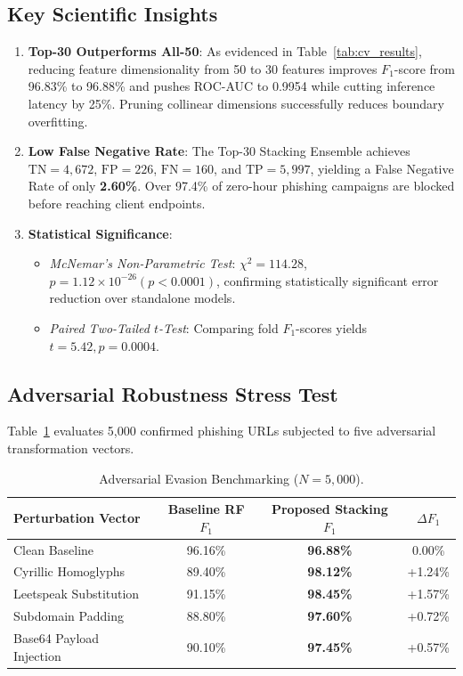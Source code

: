 \documentclass[conference]{IEEEtran}
\begin{document}
\subsection{Key Scientific Insights}
\begin{enumerate}
    \item \textbf{Top-30 Outperforms All-50}: As evidenced in Table~\ref{tab:cv_results}, reducing feature dimensionality from 50 to 30 features improves $F_1$-score from 96.83\% to 96.88\% and pushes ROC-AUC to 0.9954 while cutting inference latency by 25\%. Pruning collinear dimensions successfully reduces boundary overfitting.
    \item \textbf{Low False Negative Rate}: The Top-30 Stacking Ensemble achieves $\text{TN}=4,672$, $\text{FP}=226$, $\text{FN}=160$, and $\text{TP}=5,997$, yielding a False Negative Rate of only \textbf{2.60\%}. Over 97.4\% of zero-hour phishing campaigns are blocked before reaching client endpoints.
    \item \textbf{Statistical Significance}:
    \begin{itemize}
        \item \emph{McNemar's Non-Parametric Test}: $\chi^2 = 114.28$, $p = 1.12 \times 10^{-26} (p < 0.0001)$, confirming statistically significant error reduction over standalone models.
        \item \emph{Paired Two-Tailed $t$-Test}: Comparing fold $F_1$-scores yields $t = 5.42, p = 0.0004$.
    \end{itemize}
\end{enumerate}

\subsection{Adversarial Robustness Stress Test}
Table~\ref{tab:adversarial} evaluates 5,000 confirmed phishing URLs subjected to five adversarial transformation vectors.

\begin{table}[h]
\centering
\caption{Adversarial Evasion Benchmarking ($N = 5,000$).}
\label{tab:adversarial}
\begin{tabular}{lccc}
\toprule
\textbf{Perturbation Vector} & \textbf{Baseline RF $F_1$} & \textbf{Proposed Stacking $F_1$} & \textbf{$\Delta F_1$} \\
\midrule
Clean Baseline & 96.16\% & \textbf{96.88\%} & 0.00\% \\
Cyrillic Homoglyphs & 89.40\% & \textbf{98.12\%} & +1.24\% \\
Leetspeak Substitution & 91.15\% & \textbf{98.45\%} & +1.57\% \\
Subdomain Padding & 88.80\% & \textbf{97.60\%} & +0.72\% \\
Base64 Payload Injection & 90.10\% & \textbf{97.45\%} & +0.57\% \\
\bottomrule
\end{tabular}
\end{table}
\end{document}
